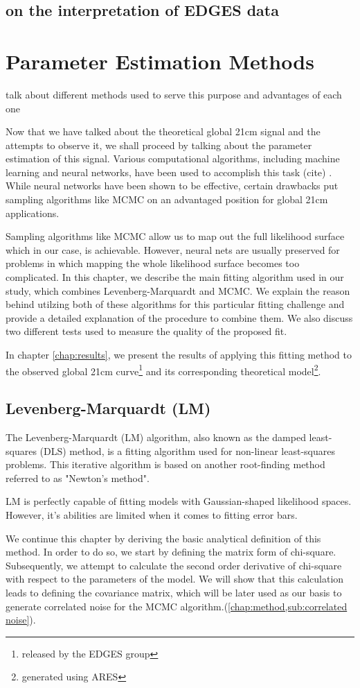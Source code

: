 \documentclass[12pt, TexShade, letterpaper]{report}
\begin{document}
\section{on the interpretation of EDGES data}
\chapter{Parameter Estimation Methods}
\label{chap:method}
talk about different methods used to serve this purpose and advantages of each one\par
Now that we have talked about the theoretical global 21cm signal and the attempts to observe it, we shall proceed by talking about the parameter estimation of this signal. Various computational algorithms, including machine learning and neural networks, have been used to accomplish this task (cite) . While neural networks have been shown to be effective, certain drawbacks  put sampling algorithms like MCMC on an advantaged position for global 21cm applications.\par
Sampling algorithms like MCMC allow us to map out the full likelihood surface which in our case, is achievable. However, neural nets are usually preserved for problems in which mapping the whole likelihood surface  becomes too complicated.
In this chapter, we describe the main fitting algorithm used in our study, which combines Levenberg-Marquardt and MCMC. We explain the reason behind utilzing both of these algorithms for this particular fitting challenge and provide a detailed explanation of the procedure to combine them. We also discuss two different tests used to measure the quality of the proposed fit.\par
In chapter \ref{chap:results}, we present the results of applying this fitting method to the observed global 21cm curve\footnote{released by the EDGES group} and its corresponding theoretical model\footnote{generated using ARES}.
\section{Levenberg-Marquardt (LM)}
\label{chap:method,sub:LM}
The Levenberg-Marquardt (LM) algorithm, also known as the damped least-squares (DLS) method, is a fitting algorithm used for non-linear least-squares problems. This iterative algorithm is based on another root-finding method referred to as "Newton's method".\par
LM is perfectly capable of fitting models with Gaussian-shaped likelihood spaces. However, it's abilities are limited when it comes to fitting error bars.\par
We continue this chapter by deriving the basic analytical definition of this method. In order to do so, we start by defining the matrix form of chi-square. Subsequently, we attempt to calculate the second order derivative of chi-square with respect to the parameters of the model. We will show that this calculation leads to defining the covariance matrix, which will be later used as our basis to generate correlated noise for the MCMC algorithm.(\ref{chap:method,sub:correlated noise}).\par
\end{document}
